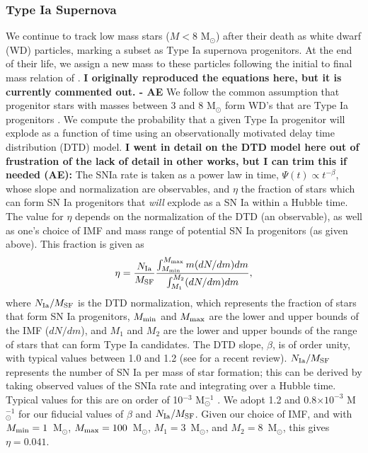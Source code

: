 \documentclass[twocolumn]{aastex61}
\begin{document}
\subsubsection{Type Ia Supernova}
\label{sec:Type Ia}
We continue to track low mass stars ($M < 8$ M$_{\odot}$) after their death as white dwarf (WD) particles, marking a subset as Type Ia supernova progenitors. At the end of their life, we assign a new mass to these particles following the initial to final mass relation of \cite{Salaris2009}. \textbf{I originally reproduced the equations here, but it is currently commented out. - AE}
We follow the common assumption that progenitor stars with masses between 3 and 8 M$_{\odot}$ form WD's that are Type Ia progenitors \citep[see][ and references therein]{Cote2017}. We compute the probability that a given Type Ia progenitor will explode as a function of time using an observationally motivated delay time distribution (DTD) model. \textbf{I went in detail on the DTD model here out of frustration of the lack of detail in other works, but I can trim this if needed (AE):} The SNIa rate is taken as a power law in time, $\Psi (t) \propto t^{-\beta}$, whose slope and normalization are observables, and $\eta$ the fraction of stars which can form SN Ia progenitors that \textit{will} explode as a SN Ia within a Hubble time. The value for $\eta$ depends on the normalization of the DTD (an observable), as well as one's choice of IMF and mass range of potential SN Ia progenitors (as given above). This fraction is given as
\begin{equation}
\eta = \frac{N_{\rm Ia}}{M_{\rm SF}} \frac{\int_{M_{\rm min}}^{M_{\rm max}} m (dN/dm) dm }{\int_{M_{1}}^{M_{2}} (dN/dm) dm},
\end{equation}
where $N_{\rm Ia}/M_{\rm SF}$ is the DTD normalization, which represents the fraction of stars that form SN Ia progenitors, $M_{\rm min}$ and $M_{\rm max}$ are the lower and upper bounds of the IMF ($dN/dm$), and $M_{1}$ and $M_{2}$ are the lower and upper bounds of the range of stars that can form Type Ia candidates. The DTD slope, $\beta$, is of order unity, with typical values between 1.0 and 1.2 (see \cite{Maoz2014} for a recent review). $N_{\rm Ia}/M_{\rm SF}$ represents the number of SN Ia per mass of star formation; this can be derived by taking observed values of the SNIa rate and integrating over a Hubble time. Typical values for this are on order of 10$^{-3}$ M$_{\odot}^{-1}$ \citep{Maoz2014}. We adopt 1.2 \cite{Maoz2010} and 0.8$\times 10^{-3}$ M$_{\odot}^{-1}$ \cite{GraurMaoz2013} for our fiducial values of $\beta$ and $N_{\rm Ia}/M_{\rm SF}$. Given our choice of IMF, and with $M_{\rm min} = 1$~M$_{\odot}$, $M_{\rm max}=100$~M$_{\odot}$, $M_{1}=3$~M$_{\odot}$, and $M_{2}=8$~M$_{\odot}$, this gives $\eta = 0.041$.
\end{document}

